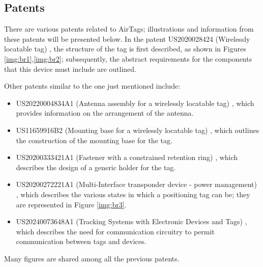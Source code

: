 \documentclass[english]{article}
\begin{document}
\subsection{Patents} 
There are various patents related to AirTags; illustrations and information from these patents will be presented below. In the patent US2020028424 (Wirelessly locatable tag) \cite{Perkins_Sano_Walton_Wang_Werner_Ashcroft_De_Hunter_Kim_Crosby_Jung_Schaevitz_Avendal_Da_Di_Nath_Papantonis_Graham_Thompson_Copeland_Ely_2022}, the structure of the tag is first described, as shown in Figures \ref{img:br1},\ref{img:br2}; subsequently, the abstract requirements for the components that this device must include are outlined. 

Other patents similar to the one just mentioned include:
\begin{itemize}
\item US20220004834A1 (Antenna assembly for a wirelessly locatable tag) \cite{Perkins_Avendal_Da_Di_Nath_Papantonis_Schaevitz_Werner_2022}, which provides information on the arrangement of the antenna.
\item US11659916B2 (Mounting base for a wirelessly locatable tag) \cite{Perkins_Thompson_2023}, which outlines the construction of the mounting base for the tag.
\item US20200333421A1 (Fastener with a constrained retention ring) \cite{Perkins_De_Hunter_2020}, which describes the design of a generic holder for the tag.
\item US20200272221A1 (Multi-Interface transponder device - power management) \cite{Foster_Nilsen_Puskarich_2020}, which describes the various states in which a positioning tag can be; they are represented in Figure \ref{img:br3}.
\item US20240073648A1 (Tracking Systems with Electronic Devices and Tags) \cite{Puskarich_2024}, which describes the need for communication circuitry to permit communication between tags and devices.
\end{itemize}
Many figures are shared among all the previous patents.
\end{document}
